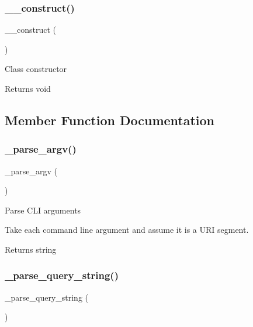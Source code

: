 \subsubsection{\texorpdfstring{\+\_\+\+\_\+construct()}{\_\_construct()}}
{\footnotesize\ttfamily \+\_\+\+\_\+construct (\begin{DoxyParamCaption}{ }\end{DoxyParamCaption})}

Class constructor

\begin{DoxyReturn}{Returns}
void 
\end{DoxyReturn}


\subsection{Member Function Documentation}
\mbox{\label{class_c_i___u_r_i_a336e05909197d401613263ebdab6550c}} 
\subsubsection{\texorpdfstring{\+\_\+parse\+\_\+argv()}{\_parse\_argv()}}
{\footnotesize\ttfamily \+\_\+parse\+\_\+argv (\begin{DoxyParamCaption}{ }\end{DoxyParamCaption})\hspace{0.3cm}{\ttfamily [protected]}}

Parse C\+LI arguments

Take each command line argument and assume it is a U\+RI segment.

\begin{DoxyReturn}{Returns}
string 
\end{DoxyReturn}
\mbox{\label{class_c_i___u_r_i_a2bb6abbe64a923ffef79a4a4c3da93db}} 
\subsubsection{\texorpdfstring{\+\_\+parse\+\_\+query\+\_\+string()}{\_parse\_query\_string()}}
{\footnotesize\ttfamily \+\_\+parse\+\_\+query\+\_\+string (\begin{DoxyParamCaption}{ }\end{DoxyParamCaption})\hspace{0.3cm}{\ttfamily [protected]}}

